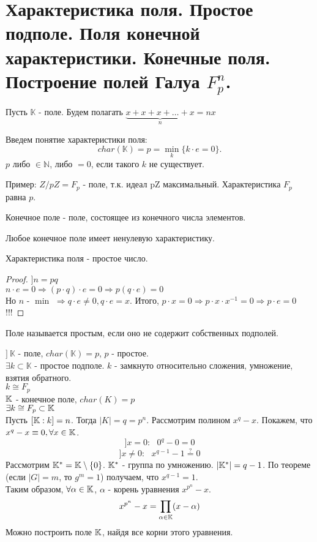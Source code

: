 \section{Характеристика поля. Простое подполе. Поля конечной характеристики. Конечные поля.
Построение полей Галуа $F_p^n$.}

Пусть $\mathbb{K}$ - поле.
Будем полагать $\underbrace{x + x + x + \dots + x}_{n} = nx$

Введем понятие характеристики поля:
\[char(\mathbb{K}) = p = \underset{k}{\min}\{k \cdot e = 0\}.\]
$p$ либо $\in \mathbb{N}$, либо $= 0$, если такого $k$ не существует.

Пример: $Z/pZ = F_p$ - поле, т.к. идеал pZ максимальный. Характеристика $F_p$ равна $p$.

\begin{defn}
Конечное поле - поле, состоящее из конечного числа элементов.
\end{defn}

\begin{thm}[Свойство]
Любое конечное поле имеет ненулевую характеристику.
\end{thm}

\begin{thm}[Свойство]
Характеристика поля - простое число.
\end{thm}
\begin{proof}
$] n = pq$ \\
$n \cdot e = 0 \Rightarrow (p \cdot q) \cdot e = 0 \Rightarrow p(q \cdot e) = 0$ \\
Но $n$ - $\min$ $\Rightarrow q \cdot e \neq 0, q \cdot e = x$.
Итого, $p \cdot x = 0 \Rightarrow p \cdot x \cdot x^{-1} = 0 \Rightarrow p \cdot e = 0$!!!
\end{proof}

\begin{defn}
Поле называется простым, если оно не содержит собственных подполей.
\end{defn}

$]~\mathbb{K}$ - поле, $char(\mathbb{K}) = p$, $p$ - простое.\\
$\exists k \subset \mathbb{K}$ - простое подполе. $k$ - замкнуто относительно сложения, умножение, взятия обратного.\\
$k \cong F_p$\\

$\mathbb{K}$ - конечное поле, $char(K) = p$\\
$\exists k \cong F_p \subset \mathbb{K}$\\
Пусть $[\mathbb{K}:k] = n$. Тогда $|K| = q = p^n$.
Рассмотрим полином $x^q-x$. Покажем, что $x^q - x \equiv 0, \forall x \in \mathbb{K}$.
\[]x = 0:~~~0^q - 0 = 0\]
\[]x \neq 0:~~~x^{q-1} - 1 \overset{?}{=} 0\]
Рассмотрим $\mathbb{K}^* = \mathbb{K} \setminus \{0\}$. $\mathbb{K}^*$ - группа по умножению. $|\mathbb{K}^*| = q - 1$. По теореме
(если $|G| = m$, то $g^m = 1$) получаем, что $x^{q - 1} = 1$. \\
Таким образом, $\forall \alpha \in \mathbb{K}$, $\alpha$ - корень уравнения $x^{p^n} - x$. \\
\[x^{p^n} - x = \underset{\alpha \in \mathbb{K}}{\prod}(x - \alpha)\]
Можно построить поле $\mathbb{K}$, найдя все корни этого уравнения.
